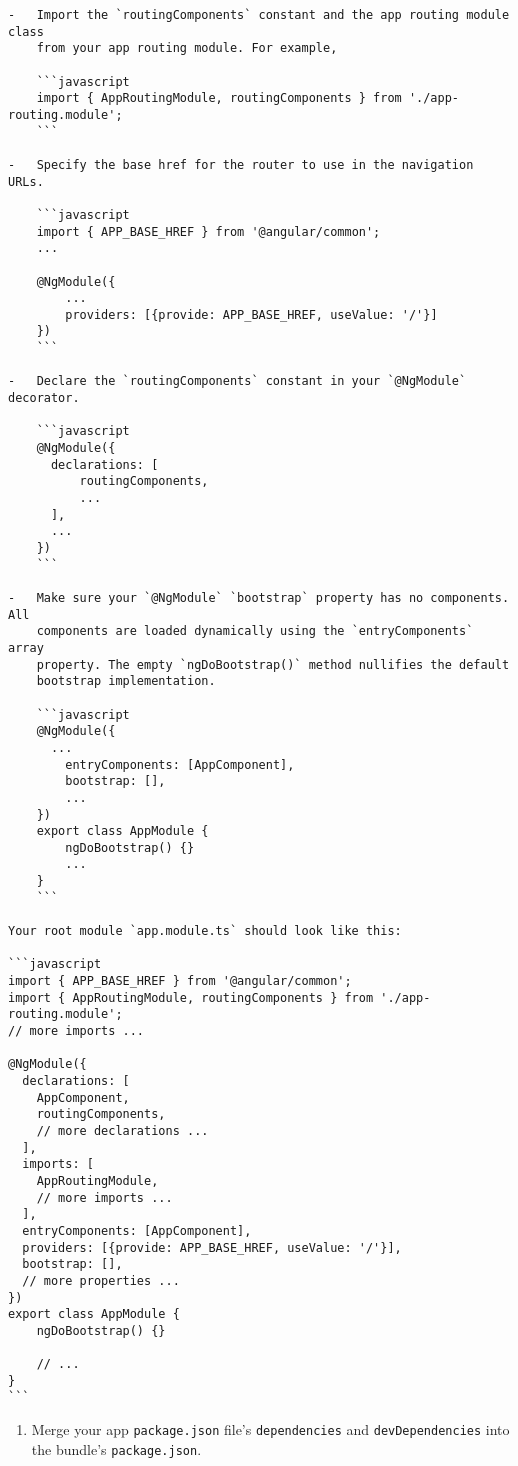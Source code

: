 \begin{verbatim}
-   Import the `routingComponents` constant and the app routing module class
    from your app routing module. For example,

    ```javascript
    import { AppRoutingModule, routingComponents } from './app-routing.module';
    ```

-   Specify the base href for the router to use in the navigation URLs. 

    ```javascript
    import { APP_BASE_HREF } from '@angular/common';
    ...
    
    @NgModule({
        ...
        providers: [{provide: APP_BASE_HREF, useValue: '/'}]
    })
    ```

-   Declare the `routingComponents` constant in your `@NgModule` decorator. 

    ```javascript
    @NgModule({
      declarations: [
          routingComponents,
          ...
      ],
      ...
    })
    ```

-   Make sure your `@NgModule` `bootstrap` property has no components. All 
    components are loaded dynamically using the `entryComponents` array
    property. The empty `ngDoBootstrap()` method nullifies the default
    bootstrap implementation. 

    ```javascript
    @NgModule({
      ...
        entryComponents: [AppComponent],
        bootstrap: [],
        ...
    })
    export class AppModule {
        ngDoBootstrap() {}
        ...
    }
    ```

Your root module `app.module.ts` should look like this: 

```javascript
import { APP_BASE_HREF } from '@angular/common';
import { AppRoutingModule, routingComponents } from './app-routing.module';
// more imports ...

@NgModule({
  declarations: [
    AppComponent,
    routingComponents, 
    // more declarations ...
  ],
  imports: [
    AppRoutingModule,
    // more imports ...
  ],
  entryComponents: [AppComponent],
  providers: [{provide: APP_BASE_HREF, useValue: '/'}],
  bootstrap: [],
  // more properties ...
})
export class AppModule {
    ngDoBootstrap() {}

    // ...
}
```
\end{verbatim}

\begin{enumerate}
\def\labelenumi{\arabic{enumi}.}
\setcounter{enumi}{8}
\tightlist
\item
  Merge your app \texttt{package.json} file's \texttt{dependencies} and
  \texttt{devDependencies} into the bundle's \texttt{package.json}.
\end{enumerate}

